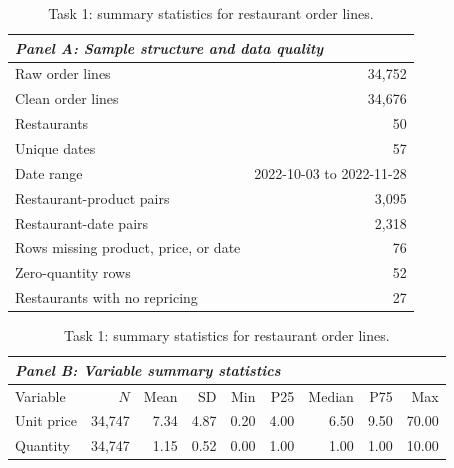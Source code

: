 \begin{table}[H]
\centering
\caption{Task 1: summary statistics for restaurant order lines.}
\label{tab:t1summary}
\begin{tabular}{lr}
\toprule
\multicolumn{2}{l}{\textit{Panel A: Sample structure and data quality}} \\
\midrule
Raw order lines & 34,752 \\
Clean order lines & 34,676 \\
Restaurants & 50 \\
Unique dates & 57 \\
Date range & 2022-10-03 to 2022-11-28 \\
Restaurant-product pairs & 3,095 \\
Restaurant-date pairs & 2,318 \\
Rows missing product, price, or date & 76 \\
Zero-quantity rows & 52 \\
Restaurants with no repricing & 27 \\
\bottomrule
\end{tabular}
\vspace{0.5em}
\small
\begin{tabular}{lrrrrrrrr}
\toprule
\multicolumn{9}{l}{\textit{Panel B: Variable summary statistics}} \\
\midrule
Variable & $N$ & Mean & SD & Min & P25 & Median & P75 & Max \\
\midrule
Unit price & 34,747 & 7.34 & 4.87 & 0.20 & 4.00 & 6.50 & 9.50 & 70.00 \\
Quantity & 34,747 & 1.15 & 0.52 & 0.00 & 1.00 & 1.00 & 1.00 & 10.00 \\
\bottomrule
\end{tabular}
\end{table}
